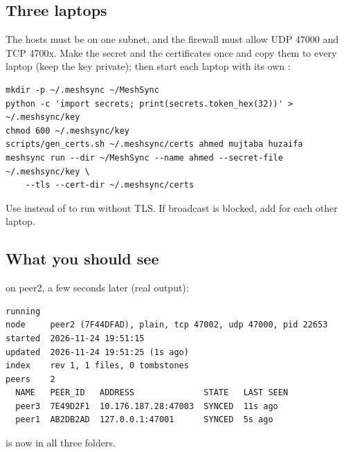 \subsection{Three laptops}
The hosts must be on one subnet, and the firewall must allow UDP 47000 and TCP 4700x. Make the
secret and the certificates once and copy them to every laptop (keep the key private); then start
each laptop with its own :
\begin{Verbatim}[frame=single,fontsize=\small]
mkdir -p ~/.meshsync ~/MeshSync
python -c 'import secrets; print(secrets.token_hex(32))' > ~/.meshsync/key
chmod 600 ~/.meshsync/key
scripts/gen_certs.sh ~/.meshsync/certs ahmed mujtaba huzaifa
meshsync run --dir ~/MeshSync --name ahmed --secret-file ~/.meshsync/key \
    --tls --cert-dir ~/.meshsync/certs
\end{Verbatim}
Use  instead of  to run without TLS. If broadcast is blocked, add
\code{--peer HOST:PORT} for each other laptop.

\subsection{What you should see}
\nopagebreak{} on peer2, a few seconds later (real output):
\begin{Verbatim}[frame=single,fontsize=\small]
running
node     peer2 (7F44DFAD), plain, tcp 47002, udp 47000, pid 22653
started  2026-11-24 19:51:15
updated  2026-11-24 19:51:25 (1s ago)
index    rev 1, 1 files, 0 tombstones
peers    2
  NAME   PEER_ID   ADDRESS              STATE   LAST SEEN
  peer3  7E49D2F1  10.176.187.28:47003  SYNCED  11s ago
  peer1  AB2DB2AD  127.0.0.1:47001      SYNCED  5s ago
\end{Verbatim}
 is now in all three  folders.
